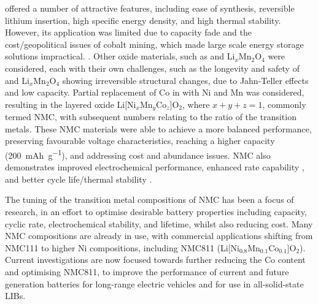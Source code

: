 \documentclass[journal=jacsat,manuscript=article]{achemso}
\begin{document}
 offered a number of attractive features, including ease of synthesis, reversible lithium insertion, high specific energy density, and high thermal stability.\cite{gibbard1989high,plichta1989improved,noh2013comparison} 
However, its application was limited due to capacity fade and the cost/geopolitical issues of cobalt mining, which made large scale energy storage solutions impractical. \cite{mo_impact_2018,Banza2009}. 
Other oxide materials, such as  and Li$_x$Mn$_2$O$_4$ were considered, each with their own challenges, such as the longevity and safety of \cite{min_comparative_2016} and Li$_x$Mn$_2$O$_4$ showing irreversible structural changes, due to Jahn-Teller effects and low capacity.\cite{tian_performance_2018} Partial replacement of Co in  with Ni and Mn was considered, resulting in the layered oxide Li[Ni$_x$Mn$_y$Co$_z$]O$_2$, where $x+y+z=1$, commonly termed NMC, with subsequent numbers relating to the ratio of the transition metals.\cite{paulsen2000o2,paulsen20002, lu2001layered,rozier2015li} 
These NMC materials were able to achieve a more balanced performance, preserving favourable voltage characteristics, reaching a higher capacity (\SI{200}{mAh.g^{-1}}), and addressing cost and abundance issues. \cite{sun_electronic_2017,larcher2015towards,ohzuku2001layered} 
NMC also demonstrates improved electrochemical performance, enhanced rate capability \cite{noh2013comparison,dahn1991rechargeable}, and better cycle life/thermal stability \cite{kim2006synthesis,armstrong1996synthesis}.

The tuning of the transition metal compositions of NMC has been a focus of research, in an effort to optimise desirable battery properties including capacity, cyclic rate, electrochemical stability, and lifetime, whilst also reducing cost.\cite{duan2019insights}
Many NMC compositions are already in use, with commercial applications shifting from NMC111 to higher Ni compositions, including NMC811 (Li[Ni$_{0.8}$Mn$_{0.1}$Co$_{0.1}$]O$_2$).\cite{zhang2018structural}
Current investigations are now focused towards further reducing the Co content and optimising NMC811, to improve the performance of current and future generation batteries for long-range electric vehicles\cite{azevedo2018mining} and for use in all-solid-state LIBs.\cite{myung2017nickel,ohzuku_layered_2001,lu2001layered,belharouak2003li,kim2014unexpected,sun_electronic_2017}
\end{document}
